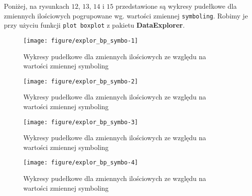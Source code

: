 \documentclass[12pt, a4paper]{article}\usepackage[]{graphicx}\usepackage[]{xcolor}
\makeatletter
\def\maxwidth{ %
  \ifdim\Gin@nat@width>\linewidth
    \linewidth
  \else
    \Gin@nat@width
  \fi
}
\newenvironment{knitrout}{}{} %
\makeatother
\begin{document}
Poniżej, na rysunkach $12$, $13$, $14$ i $15$ przedstawione są wykresy pudełkowe dla zmiennych ilościowych pogrupowane wg. wartości zmiennej \texttt{symboling}. Robimy je przy użyciu funkcji \texttt{plot boxplot} z pakietu \textbf{DataExplorer}.
\begin{knitrout}
\color{fgcolor}\begin{figure}[H]

{\centering \texttt{[image: figure/explor\_bp\_symbo-1]} 

}

\caption[Wykresy pudełkowe dla zmiennych ilościowych ze względu na wartości zmiennej symboling]{Wykresy pudełkowe dla zmiennych ilościowych ze względu na wartości zmiennej symboling}\label{fig:explor_bp_symbo-1}
\end{figure}

\begin{figure}[H]

{\centering \texttt{[image: figure/explor\_bp\_symbo-2]} 

}

\caption[Wykresy pudełkowe dla zmiennych ilościowych ze względu na wartości zmiennej symboling]{Wykresy pudełkowe dla zmiennych ilościowych ze względu na wartości zmiennej symboling}\label{fig:explor_bp_symbo-2}
\end{figure}

\begin{figure}[H]

{\centering \texttt{[image: figure/explor\_bp\_symbo-3]} 

}

\caption[Wykresy pudełkowe dla zmiennych ilościowych ze względu na wartości zmiennej symboling]{Wykresy pudełkowe dla zmiennych ilościowych ze względu na wartości zmiennej symboling}\label{fig:explor_bp_symbo-3}
\end{figure}

\begin{figure}[H]

{\centering \texttt{[image: figure/explor\_bp\_symbo-4]} 

}

\caption[Wykresy pudełkowe dla zmiennych ilościowych ze względu na wartości zmiennej symboling]{Wykresy pudełkowe dla zmiennych ilościowych ze względu na wartości zmiennej symboling}\label{fig:explor_bp_symbo-4}
\end{figure}

\end{knitrout}
\end{document}
